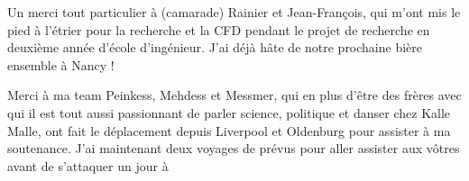 Un merci tout particulier à (camarade) Rainier et Jean-François, qui m'ont mis le pied à l'étrier pour la recherche et la CFD pendant le projet de recherche en deuxième année d'école d'ingénieur. J'ai déjà hâte de notre prochaine bière ensemble à Nancy !






Merci à ma team Peinkess, Mehdess et Messmer, qui en plus d'être des frères avec qui il est tout aussi passionnant de parler science, politique et danser chez Kalle Malle, ont fait le déplacement depuis Liverpool et Oldenburg pour assister à ma soutenance. J'ai maintenant deux voyages de prévus pour aller assister aux vôtres avant de s'attaquer un jour à 




\endgroup